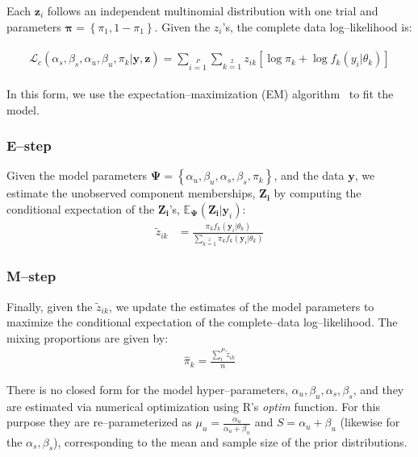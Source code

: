 \documentclass[11pt]{article}
\begin{document}
Each $\mathbf{z}_{i}$ follows an independent multinomial distribution with one trial and  parameters $\boldsymbol{\pi}=\left\{\pi_1,1-\pi_1\right\}$. Given the $z_i$'s, the complete data log--likelihood is:

\begin{align}
\begin{split}
\mathcal{L}_c(\alpha_s,\beta_s,\alpha_u,\beta_u,\pi_k|\mathbf{y},\mathbf{z})=\sum\limits_{i=1}\limits^P\sum\limits_{k=1}\limits^2{z_{ik}\left[ \log\pi_k+\log f_k(y_i|\theta_k)\right]}\label{eq:CDLL}
\end{split}
\end{align}

In this form, we use the expectation--maximization (EM) algorithm~\cite{Dempster:1977ul} to fit the model. 

\subsubsection*{E--step}
Given the model parameters $\boldsymbol{\Psi}=\left\{\alpha_u,\beta_u,\alpha_s,\beta_s,\pi_k\right\}$, and the data $\mathbf{y}$, we estimate the unobserved component memberships, $\mathbf{Z_i}$  by computing the conditional expectation of the $\mathbf{Z_i}$'s,  $\mathbb{E}\boldsymbol{_\Psi}(\mathbf{Z_i}|\mathbf{y}_i)$:
\begin{align}
\tilde z_{ik} &= \frac{\pi_k f_k(\mathbf{y}_i|\theta_k)}{\sum\limits_{k=1}\limits^{2}\pi_kf_k(\mathbf{y}_i|\theta_k)}
\end{align}

\subsubsection*{M--step}
Finally, given the $\tilde{z}_{ik}$, we update the estimates of the model parameters to maximize the conditional expectation of the complete--data log--likelihood. The mixing proportions are given by:
\begin{align}
\hat\pi_k = \frac{ \sum_i^P \tilde z_{ik}}{n}
\end{align}

There is no closed form for the model hyper--parameters, $\alpha_u,\beta_u,\alpha_s,\beta_s$, and they are estimated via numerical optimization using R's \textit{optim} function. For this purpose they are re--parameterized as $\mu_u=\frac{\alpha_u}{\alpha_u+\beta_u}$ and $S=\alpha_u+\beta_u$ (likewise for the $\alpha_s,\beta_s$), corresponding to the mean and sample size of the prior distributions. 
\end{document}
